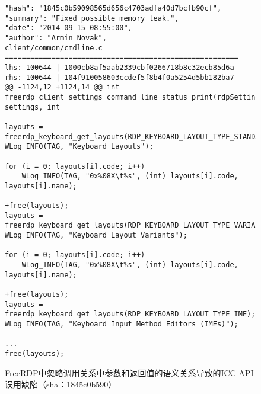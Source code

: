 \begin{figure}[b]
	\centering
\begin{lstlisting}
"hash": "1845c0b59098565d656c4703adfa40d7bcfb90cf",
"summary": "Fixed possible memory leak.",
"date": "2014-09-15 08:55:00",
"author": "Armin Novak",
client/common/cmdline.c
=======================================================
lhs: 100644 | 1000cb8af5aab2339cbf0266718b8c32ecb85d6a
rhs: 100644 | 104f910058603ccdef5f8b4f0a5254d5bb182ba7
@@ -1124,12 +1124,14 @@ int freerdp_client_settings_command_line_status_print(rdpSettings* settings, int

layouts = freerdp_keyboard_get_layouts(RDP_KEYBOARD_LAYOUT_TYPE_STANDARD);
WLog_INFO(TAG, "Keyboard Layouts");

for (i = 0; layouts[i].code; i++)
	WLog_INFO(TAG, "0x%08X\t%s", (int) layouts[i].code, layouts[i].name);
	
+free(layouts);
layouts = freerdp_keyboard_get_layouts(RDP_KEYBOARD_LAYOUT_TYPE_VARIANT);
WLog_INFO(TAG, "Keyboard Layout Variants");

for (i = 0; layouts[i].code; i++)
	WLog_INFO(TAG, "0x%08X\t%s", (int) layouts[i].code, layouts[i].name);

+free(layouts);
layouts = freerdp_keyboard_get_layouts(RDP_KEYBOARD_LAYOUT_TYPE_IME);
WLog_INFO(TAG, "Keyboard Input Method Editors (IMEs)");

...
free(layouts);
\end{lstlisting}
	\caption{
	FreeRDP中忽略调用关系中参数和返回值的语义关系导致的ICC-API误用缺陷（sha：1845c0b590）
	}
	\label{fig:2-3-icc-2}
\end{figure}